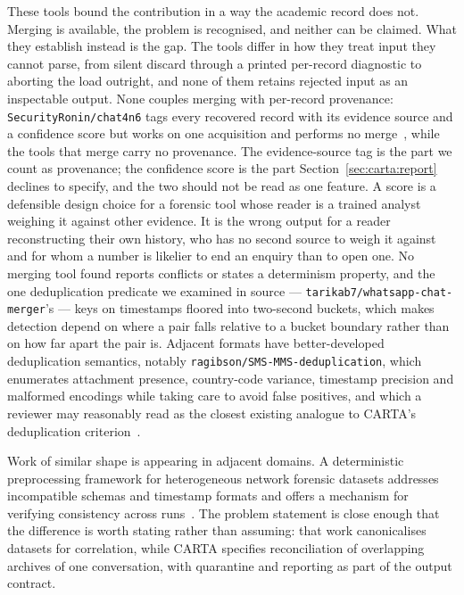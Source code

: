 These tools bound the contribution in a way the academic record does not. Merging
is available, the problem is recognised, and neither can be claimed. What they
establish instead is the gap. The tools differ in how they treat input they cannot
parse, from silent discard through a printed per-record diagnostic to aborting the
load outright, and none of them retains rejected input as an inspectable output.
None couples merging with per-record provenance:
\texttt{SecurityRonin/\allowbreak chat4n6} tags every recovered record with its evidence source
and a confidence score but works on one acquisition and performs no
merge~\citep{repo_chat4n6}, while the tools that merge carry no provenance. The
evidence-source tag is the part we count as provenance; the confidence score is
the part Section~\ref{sec:carta:report} declines to specify, and the two should
not be read as one feature. A score is a defensible design choice for a forensic
tool whose reader is a trained analyst weighing it against other evidence. It is
the wrong output for a reader reconstructing their own history, who has no second
source to weigh it against and for whom a number is likelier to end an enquiry
than to open one. No
merging tool found reports conflicts or states a determinism property, and the one
deduplication predicate we examined in source ---
\texttt{tarikab7/\allowbreak whatsapp-chat-merger}'s --- keys on timestamps floored into
two-second buckets, which makes detection depend on where a pair falls relative to
a bucket boundary rather than on how far apart the pair is. Adjacent formats have
better-developed deduplication semantics, notably
\texttt{ragibson/\allowbreak SMS-MMS-deduplication}, which enumerates attachment presence,
country-code variance, timestamp precision and malformed encodings while taking
care to avoid false positives, and which a reviewer may reasonably read as the
closest existing analogue to CARTA's deduplication
criterion~\citep{repo_smsmmsdedup}.

Work of similar shape is appearing in adjacent domains. A deterministic
preprocessing framework for heterogeneous network forensic datasets addresses
incompatible schemas and timestamp formats and offers a mechanism for verifying
consistency across runs~\citep{chaudhary2026preprocessing}. The problem statement
is close enough that the difference is worth stating rather than assuming: that
work canonicalises datasets for correlation, while CARTA specifies reconciliation
of overlapping archives of one conversation, with quarantine and reporting as part
of the output contract.

